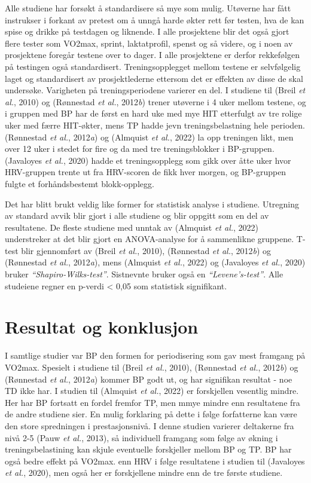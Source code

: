 \documentclass[
  letterpaper,
  DIV=11,
  numbers=noendperiod]{scrreprt}
\begin{document}
Alle studiene har forsøkt å standardisere så mye som mulig. Utøverne har
fått instrukser i forkant av pretest om å unngå harde økter rett før
testen, hva de kan spise og drikke på testdagen og liknende. I alle
prosjektene blir det også gjort flere tester som VO2max, sprint,
laktatprofil, spenst og så videre, og i noen av prosjektene foregår
testene over to dager. I alle prosjektene er derfor rekkefølgen på
testingen også standardisert. Treningsopplegget mellom testene er
selvfølgelig laget og standardisert av prosjektlederne ettersom det er
effekten av disse de skal undersøke. Varigheten på treningsperiodene
varierer en del. I studiene til (Breil \emph{et al.}, 2010) og
(Rønnestad \emph{et al.}, 2012\emph{b}) trener utøverne i 4 uker mellom
testene, og i gruppen med BP har de først en hard uke med mye HIT
etterfulgt av tre rolige uker med færre HIT-økter, mens TP hadde jevn
treningsbelastning hele perioden. (Rønnestad \emph{et al.},
2012\emph{a}) og (Almquist \emph{et al.}, 2022) la opp treningen likt,
men over 12 uker i stedet for fire og da med tre treningsblokker i
BP-gruppen. (Javaloyes \emph{et al.}, 2020) hadde et treningsopplegg som
gikk over åtte uker hvor HRV-gruppen trente ut fra HRV-scoren de fikk
hver morgen, og BP-gruppen fulgte et forhåndsbestemt blokk-opplegg.

Det har blitt brukt veldig like former for statistisk analyse i
studiene. Utregning av standard avvik blir gjort i alle studiene og blir
oppgitt som en del av resultatene. De fleste studiene med unntak av
(Almquist \emph{et al.}, 2022) understreker at det blir gjort en
ANOVA-analyse for å sammenlikne gruppene. T-test blir gjennomført av
(Breil \emph{et al.}, 2010), (Rønnestad \emph{et al.}, 2012\emph{b}) og
(Rønnestad \emph{et al.}, 2012\emph{a}), mens (Almquist \emph{et al.},
2022) og (Javaloyes \emph{et al.}, 2020) bruker
\emph{``Shapiro-Wilks-test''}. Sistnevnte bruker også en
\emph{``Levene's-test''}. Alle studeiene regner en p-verdi \textless{}
0,05 som statistisk signifikant.

\section{Resultat og konklusjon}\label{resultat-og-konklusjon}

I samtlige studier var BP den formen for periodisering som gav mest
framgang på VO2max. Spesielt i studiene til (Breil \emph{et al.}, 2010),
(Rønnestad \emph{et al.}, 2012\emph{b}) og (Rønnestad \emph{et al.},
2012\emph{a}) kommer BP godt ut, og har signifikan resultat - noe TD
ikke har. I studien til (Almquist \emph{et al.}, 2022) er forskjellen
vesentlig mindre. Her har BP fortsatt en fordel fremfor TP, men mmye
mindre enn resultatene fra de andre studiene sier. En mulig forklaring
på dette i følge forfatterne kan være den store spredningen i
prestasjonsnivå. I denne studien varierer deltakerne fra nivå 2-5 (Pauw
\emph{et al.}, 2013), så individuell framgang som følge av økning i
treningsbelastining kan skjule eventuelle forskjeller mellom BP og TP.
BP har også bedre effekt på VO2max. enn HRV i følge resultatene i
studien til (Javaloyes \emph{et al.}, 2020), men også her er
forskjellene mindre enn de tre første studiene.
\end{document}
